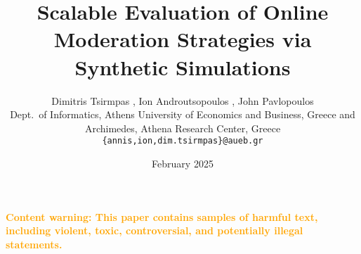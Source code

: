 \documentclass[11pt]{article}
\title{Scalable Evaluation of Online Moderation Strategies via Synthetic Simulations}
\author{
    Dimitris Tsirmpas \orcidlink{0000-0002-5675-3939}, Ion Androutsopoulos \orcidlink{0009-0000-2969-0509}, John Pavlopoulos \orcidlink{0000-0001-9188-7425} \\
    Dept.\ of Informatics, Athens University of Economics and Business, Greece and \\
    Archimedes, Athena Research Center, Greece \\
    \texttt{\{annis,ion,dim.tsirmpas\}@aueb.gr}
}
\date{February 2025}
\newcommand{\textWarning}[1]{\begin{center}\textcolor{orange}{\textbf{#1}}\end{center}}
\begin{document}
\maketitle

\textWarning{Content warning: This paper contains samples of harmful text, including violent, toxic, controversial, and potentially illegal statements.}













\end{document}
